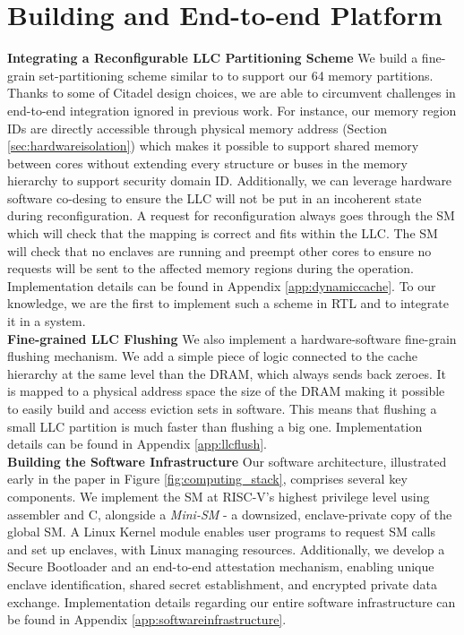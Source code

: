 \section{Building and End-to-end Platform}

\noindent\textbf{Integrating a Reconfigurable LLC Partitioning Scheme}
\label{sec:dynamiccache}
We build a fine-grain set-partitioning scheme similar to \cite{townley2022composable,saileshwar2021bespoke} to support our 64 memory partitions.
Thanks to some of Citadel design choices, we are able to circumvent challenges in end-to-end integration ignored in previous work.
For instance, our memory region IDs are directly accessible through physical memory address (Section \ref{sec:hardwareisolation}) which makes it possible to support shared memory between cores without extending every structure or buses in the memory hierarchy to support security domain ID.
Additionally, we can leverage hardware software co-desing to ensure the LLC will not be put in an incoherent state during reconfiguration.
A request for reconfiguration always goes through the SM which will check 
that the mapping is correct and fits within the LLC.
The SM will check that no enclaves are running and preempt other cores to ensure no requests will be sent to the affected memory regions during the operation.
Implementation details can be found in Appendix \ref{app:dynamiccache}.
To our knowledge, we are the first to implement such a scheme in RTL and to integrate it in a system.
\\

\noindent\textbf{Fine-grained LLC Flushing}
We also implement a hardware-software fine-grain flushing mechanism.
We add a simple piece of logic connected to the cache hierarchy at the same level than the DRAM, which always sends back zeroes.
It is mapped to a physical address space the size of the DRAM making it possible to easily build and access eviction sets in software.
This means that flushing a small LLC partition is much faster than flushing a big one.
Implementation details can be found in Appendix \ref{app:llcflush}.
\\

\noindent\textbf{Building the Software Infrastructure}
Our software architecture, illustrated early in the paper in Figure \ref{fig:computing_stack}, comprises several key components. 
We implement the SM at RISC-V's highest privilege level using assembler and C, alongside a \emph{Mini-SM} - a downsized, enclave-private copy of the global SM.
A Linux Kernel module enables user programs to request SM calls and set up enclaves, with Linux managing resources.
Additionally, we develop a Secure Bootloader and an end-to-end attestation mechanism, enabling unique enclave identification, shared secret establishment, and encrypted private data exchange.
Implementation details regarding our entire software infrastructure can be found in Appendix \ref{app:softwareinfrastructure}.
